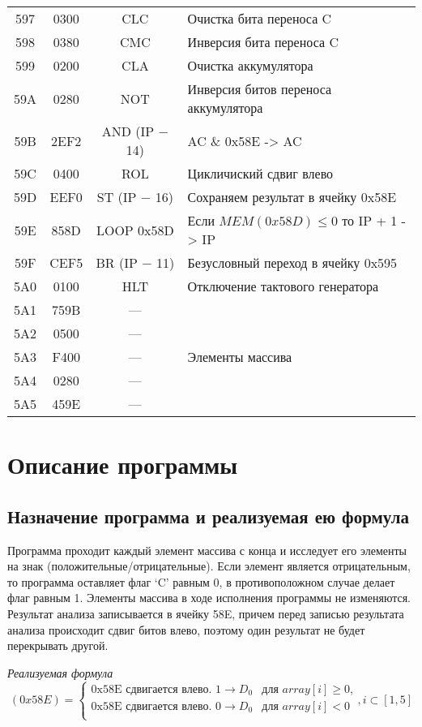 \begin{center}
\begin{tabular}{|c|c|c|l|}
597 & 0300 & CLC & Очистка бита переноса C\\
598 & 0380 & CMC & Инверсия бита переноса C\\
599 & 0200 & CLA & Очистка аккумулятора\\
59A & 0280 & NOT & Инверсия битов переноса аккумулятора\\
59B & 2EF2 & AND (IP $-$ 14) & AC \& 0x58E -> AC\\
59C & 0400 & ROL & Цикличиский сдвиг влево\\
59D & EEF0 & ST (IP $-$ 16) & Сохраняем результат в ячейку 0x58E\\
59E & 858D & LOOP 0x58D & Если $MEM(0x58D)\leq 0$ то IP + 1 -> IP\\
59F & CEF5 & BR (IP $-$ 11) & Безусловный переход в ячейку 0x595\\
5A0 & 0100 & HLT & Отключение тактового генератора\\
\hline
\hline
5A1 & 759B & --- & \\
5A2 & 0500 & --- & \\
5A3 & F400 & --- & Элементы массива\\
5A4 & 0280 & --- & \\
5A5 & 459E & --- & \\
\hline
\end{tabular}
\end{center}

\newpage


\section{Описание программы}
\subsection{Назначение программа и реализуемая ею формула}
Программа проходит каждый элемент массива с конца и исследует его элементы на знак (положительные/отрицательные). Если элемент является отрицательным, то программа оставляет флаг `C' равным 0, в противоположном случае делает флаг равным 1. Элементы массива в ходе исполнения программы не изменяются. Результат анализа записывается в ячейку 58E, причем перед записью результата анализа происходит сдвиг битов влево, поэтому один результат не будет перекрывать другой.

\begin{center}
	\textit{Реализуемая формула}
	\[ (0x58E) = \left\{
	\begin{array}{ll}
	 \textrm{0x58E сдвигается влево. }1 \rightarrow D_{0} & \textrm{для } array[i] \geq 0\textrm{,}\\
	 \textrm{0x58E сдвигается влево. }0 \rightarrow D_{0} & \textrm{для } array[i] < 0\\
	\end{array} \right. , i \subset [1, 5]\]
\end{center}

